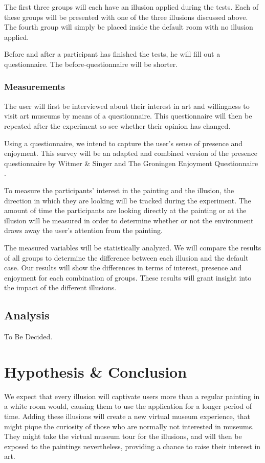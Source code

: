 \documentclass[a4paper]{article}
\begin{document}
The first three groups will each have an illusion applied during the tests. Each of these groups will be presented with one of the three illusions discussed above. The fourth group will simply be placed inside the default room with no illusion applied. 

Before and after a participant has finished the tests, he will fill out a questionnaire. The before-questionnaire will be shorter.

\subsubsection{Measurements}\label{sec:measurements}

The user will first be interviewed about their interest in art and willingness to visit art museums by means of a questionnaire. This questionnaire will then be repeated after the experiment so see whether their opinion has changed.

Using a questionnaire, we intend to capture the user's sense of presence and enjoyment. This survey will be an adapted and combined version of the presence questionnaire by Witmer \& Singer \cite{witmer} and The Groningen Enjoyment Questionnaire \cite{stevens}.

To measure the participants' interest in the painting and the illusion, the direction in which they are looking will be tracked during the experiment. The amount of time the participants are looking directly at the painting or at the illusion will be measured in order to determine whether or not the environment draws away the user's attention from the painting. 

The measured variables will be statistically analyzed. We will compare the results of all groups to determine the difference between each illusion and the default case. Our results will show the differences in terms of interest, presence and enjoyment for each combination of groups. These results will grant insight into the impact of the different illusions.

\subsection{Analysis}
To Be Decided.

\section {Hypothesis \& Conclusion}
We expect that every illusion will captivate users more than a regular painting in a white room would, causing them to use the application for a longer period of time. Adding these illusions will create a new virtual museum experience, that might pique the curiosity of those who are normally not interested in museums. They might take the virtual museum tour for the illusions, and will then be exposed to the paintings nevertheless, providing a chance to raise their interest in art. 
\end{document}
